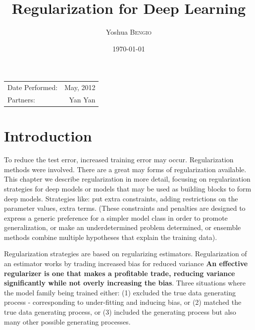 \documentclass{article}
\title{Regularization for Deep Learning} %
\author{Yoshua  \textsc{Bengio}} %
\date{\today} %
\begin{document}
\maketitle %

\begin{center}
\begin{tabular}{l r}
Date Performed: & May, 2012 \\ %
Partners: & Yan Yan \\ %
\end{tabular}
\end{center}



\section{Introduction}

To reduce the test error, increased training error may occur. 
Regularization methods were involved. 
There are a great may forms of regularization available. 
This chapter we describe regularization in more detail, focusing on regularization strategies for deep models or models that may be used as building blocks to form deep models.
Strategies like: put extra constraints, adding restrictions on the parameter values, extra terms. 
(These constraints and penalties are designed to express a generic preference for a simpler model class in order to promote generalization, or make an underdetermined problem determined, or ensemble methods combine multiple hypotheses that explain the training data).

Regularization strategies are based on regularizing estimators. Regularization of an estimator works by trading increased bias for reduced variance
\textbf{An effective regularizer is one that makes a profitable trade, reducing variance significantly while not overly increasing the bias}.
Three situations where the model family being trained either:
(1) excluded the true data generating process - corresponding to under-fitting and inducing bias, or 
(2) matched the true data generating process, or
(3) included the generating process but also many other possible generating processes.
\end{document}
